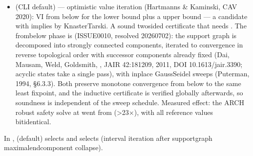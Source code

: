 \documentclass[a4paper,10pt,english]{sphinxmanual}
\begin{document}
\begin{itemize}
\item {} 
\sphinxAtStartPar
{} (CLI default) — optimistic value iteration (Hartmanns \& Kaminski,
CAV 2020): VI from below for the lower bound plus a  upper bound
— a candidate  with  implies  by Knaster\sphinxhyphen{}Tarski. A sound
two\sphinxhyphen{}sided certificate that needs . The from\sphinxhyphen{}below phase
is  (ISSUE\sphinxhyphen{}0010, resolved 2026\sphinxhyphen{}07\sphinxhyphen{}02): the support graph
is decomposed into strongly connected components, iterated to convergence in reverse
topological order with successor components already fixed (Dai, Mausam, Weld,
Goldsmith, , JAIR 42:181\textendash{}209, 2011, DOI
10.1613/jair.3390; acyclic states take a single pass), with in\sphinxhyphen{}place Gauss\textendash{}Seidel
sweeps (Puterman, 1994, \S{}6.3.3). Both preserve monotone convergence from below to the
same least fixpoint, and the inductive certificate is verified globally afterwards,
so soundness is independent of the sweep schedule. Measured effect: the ARCH 
robust safety solve at  went from  (\textgreater{}23×),
with all reference values bit\sphinxhyphen{}identical.

\end{itemize}

\sphinxAtStartPar
In ,  (default) selects  and
 selects  (interval iteration after
support\sphinxhyphen{}graph maximal\sphinxhyphen{}end\sphinxhyphen{}component collapse).
\end{document}

